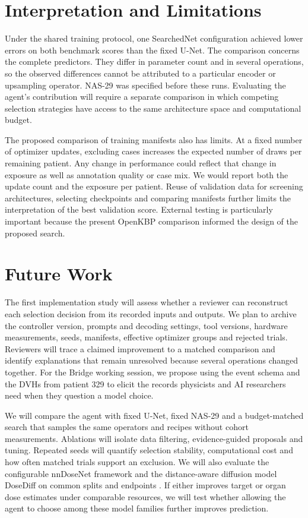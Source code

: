 \documentclass[letterpaper]{article}
\begin{document}
\section{Interpretation and Limitations}
Under the shared training protocol, one SearchedNet configuration achieved lower errors on both benchmark scores than the fixed U-Net. The comparison concerns the complete predictors. They differ in parameter count and in several operations, so the observed differences cannot be attributed to a particular encoder or upsampling operator. NAS-29 was specified before these runs. Evaluating the agent's contribution will require a separate comparison in which competing selection strategies have access to the same architecture space and computational budget.

The proposed comparison of training manifests also has limits. At a fixed number of optimizer updates, excluding cases increases the expected number of draws per remaining patient. Any change in performance could reflect that change in exposure as well as annotation quality or case mix. We would report both the update count and the exposure per patient. Reuse of validation data for screening architectures, selecting checkpoints and comparing manifests further limits the interpretation of the best validation score. External testing is particularly important because the present OpenKBP comparison informed the design of the proposed search.

\section{Future Work}
The first implementation study will assess whether a reviewer can reconstruct each selection decision from its recorded inputs and outputs. We plan to archive the controller version, prompts and decoding settings, tool versions, hardware measurements, seeds, manifests, effective optimizer groups and rejected trials. Reviewers will trace a claimed improvement to a matched comparison and identify explanations that remain unresolved because several operations changed together. For the Bridge working session, we propose using the event schema and the DVHs from patient 329 to elicit the records physicists and AI researchers need when they question a model choice.

We will compare the agent with fixed U-Net, fixed NAS-29 and a budget-matched search that samples the same operators and recipes without cohort measurements. Ablations will isolate data filtering, evidence-guided proposals and tuning. Repeated seeds will quantify selection stability, computational cost and how often matched trials support an exclusion. We will also evaluate the configurable nnDoseNet framework and the distance-aware diffusion model DoseDiff on common splits and endpoints \citep{nndose,dosediff}. If either improves target or organ dose estimates under comparable resources, we will test whether allowing the agent to choose among these model families further improves prediction.
\end{document}
